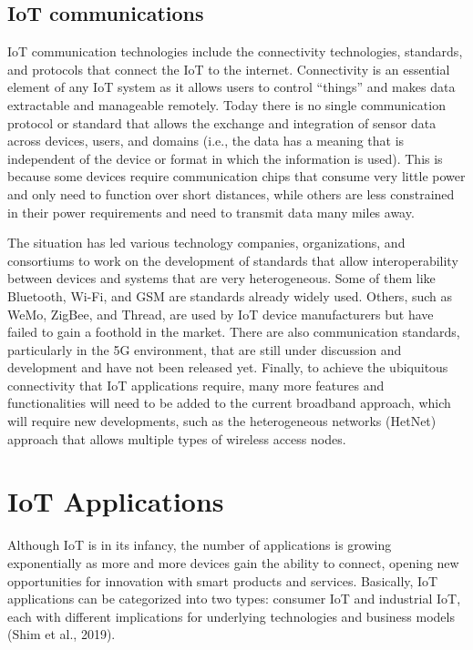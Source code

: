 \documentclass[
  letterpaper,
  DIV=11,
  numbers=noendperiod]{scrreprt}
\begin{document}
\hypertarget{iot-communications}{%
\subsection{IoT communications}\label{iot-communications}}

IoT communication technologies include the connectivity technologies,
standards, and protocols that connect the IoT to the internet.
Connectivity is an essential element of any IoT system as it allows
users to control ``things'' and makes data extractable and manageable
remotely. Today there is no single communication protocol or standard
that allows the exchange and integration of sensor data across devices,
users, and domains (i.e., the data has a meaning that is independent of
the device or format in which the information is used). This is because
some devices require communication chips that consume very little power
and only need to function over short distances, while others are less
constrained in their power requirements and need to transmit data many
miles away.

The situation has led various technology companies, organizations, and
consortiums to work on the development of standards that allow
interoperability between devices and systems that are very
heterogeneous. Some of them like Bluetooth, Wi-Fi, and GSM are standards
already widely used. Others, such as WeMo, ZigBee, and Thread, are used
by IoT device manufacturers but have failed to gain a foothold in the
market. There are also communication standards, particularly in the 5G
environment, that are still under discussion and development and have
not been released yet. Finally, to achieve the ubiquitous connectivity
that IoT applications require, many more features and functionalities
will need to be added to the current broadband approach, which will
require new developments, such as the heterogeneous networks (HetNet)
approach that allows multiple types of wireless access nodes.

\hypertarget{iot-applications}{%
\section{IoT Applications}\label{iot-applications}}

Although IoT is in its infancy, the number of applications is growing
exponentially as more and more devices gain the ability to connect,
opening new opportunities for innovation with smart products and
services. Basically, IoT applications can be categorized into two types:
consumer IoT and industrial IoT, each with different implications for
underlying technologies and business models (Shim et al., 2019).
\end{document}
